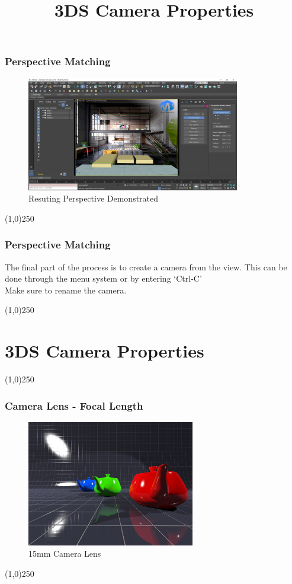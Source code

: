\begin{frame}
	\frametitle{Perspective Matching}
	\begin{figure}
		\centering
		\includegraphics[height=5cm]{./img/PerspectiveMatching/7.jpg}
		\caption[Resuting Perspective Demonstrated]{Resuting Perspective Demonstrated}
		\label{fig:PerspectiveMatch7}
	\end{figure}
\end{frame}
\begin{center}\line(1,0){250}\end{center}


\begin{frame}
	\frametitle{Perspective Matching}
	The final part of the process is to create a camera from the view.  This can be done through the menu system or by entering `Ctrl-C'\\
	Make sure to rename the camera.
	
\end{frame}
\begin{center}\line(1,0){250}\end{center}





\section{3DS Camera Properties}
\begin{frame}
\title[3DS Camera Properties]{3DS Camera Properties}
\titlepage
\end{frame}\begin{center}\line(1,0){250}\end{center}

\begin{frame}
\frametitle{Camera Lens - Focal Length}
\begin{figure}
	\centering
	\includegraphics[height=5.5cm]{img/Cameras/15mm.jpg}
	\caption[15mm Camera Lens]{15mm Camera Lens}
	\label{fig:15mm}
\end{figure}
\end{frame}
\begin{center}\line(1,0){250}\end{center}


